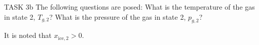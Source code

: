 TASK 3b  
The following questions are posed:  
What is the temperature of the gas in state 2, \( T_{g,2} \)?  
What is the pressure of the gas in state 2, \( p_{g,2} \)?  

It is noted that \( x_{\text{ice},2} > 0 \).